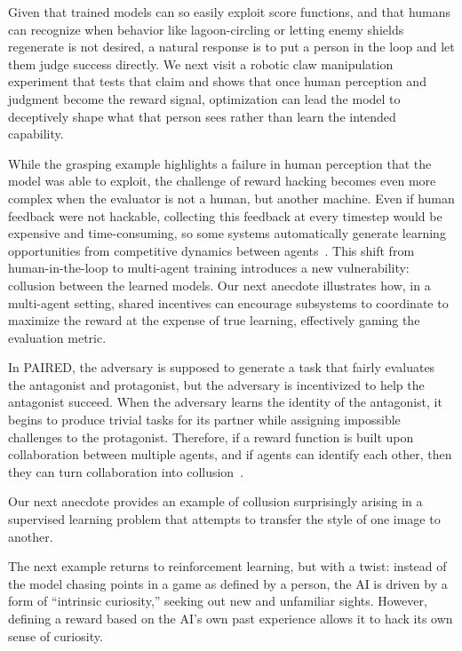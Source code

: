 \documentclass[10pt]{article}
\def\citep#1{}%
\begin{document}
Given that trained models can so easily exploit score functions, and that humans can recognize when behavior like lagoon-circling or letting enemy shields regenerate is not desired, a natural response is to put a person in the loop and let them judge success directly.
We next visit a robotic claw manipulation experiment that tests that claim and shows that once human perception and judgment become the reward signal, optimization can lead the model to deceptively shape what that person sees rather than learn the intended capability.



While the grasping example highlights a failure in human perception that the model was able to exploit, the challenge of reward hacking becomes even more complex when the evaluator is not a human, but another machine. 
Even if human feedback were not hackable, collecting this feedback at every timestep would be expensive and time-consuming, so some systems automatically generate learning opportunities from competitive dynamics between agents~\citep{foerster2018learningopponentlearningawareness, leibo2019autocurriculaemergenceinnovationsocial}.
This shift from human-in-the-loop to multi-agent training introduces a new vulnerability: collusion between the learned models.
Our next anecdote illustrates how, in a multi-agent setting, shared incentives can encourage subsystems to coordinate to maximize the reward at the expense of true learning, effectively gaming the evaluation metric.



In PAIRED, the adversary is supposed to generate a task that fairly evaluates the antagonist and protagonist, but the adversary is incentivized to help the antagonist succeed. When the adversary learns the identity of the antagonist, it begins to produce trivial tasks for its partner while assigning impossible challenges to the protagonist.
Therefore, if a reward function is built upon collaboration between multiple agents, and if agents can identify each other, then they can turn collaboration into collusion~\citep{cui2023adversarial}.

Our next anecdote provides an example of collusion surprisingly arising in a supervised learning problem that attempts to transfer the style of one image to another.



The next example returns to reinforcement learning, but with a twist: instead of the model chasing points in a game as defined by a person, the AI is driven by a form of ``intrinsic curiosity,'' seeking out new and unfamiliar sights.
However, defining a reward based on the AI's own past experience allows it to hack its own sense of curiosity. 
\end{document}
